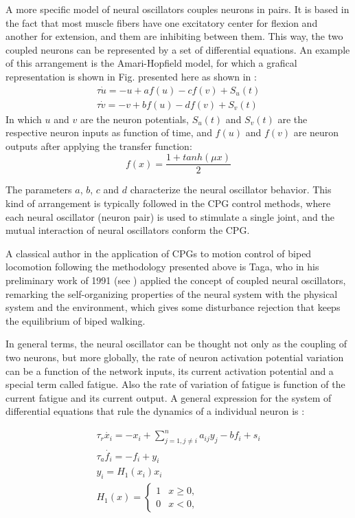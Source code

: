 A more specific model of neural oscillators couples neurons in
pairs. It is based in the fact that most muscle fibers have one
excitatory center for flexion and another for extension, and them are
inhibiting between them. This way, the two coupled neurons can be
represented by a set of differential equations. An example of this
arrangement is the Amari-Hopfield model, for which a grafical
representation is shown in Fig. presented here as shown in
\cite{Nakada2003}:
\begin{eqnarray}
  \tau\dot{u}=-u+af(u)-cf(v)+S_u(t) \\
  \tau\dot{v}=-v+bf(u)-df(v)+S_v(t)
\end{eqnarray}
In which $u$ and $v$ are the neuron potentials, $S_u(t)$ and $S_v(t)$
are the respective neuron inputs as function of time, and $f(u)$ and
$f(v)$ are neuron outputs after applying the transfer function:
\begin{equation}
  f(x)=\frac{1+tanh(\mu x)}{2}
\end{equation}


The parameters $a$, $b$, $c$ and $d$ characterize the neural
oscillator behavior. This kind of arrangement is typically followed in
the CPG control methods, where each neural oscillator (neuron pair) is
used to stimulate a single joint, and the mutual interaction of neural
oscillators conform the CPG.


A classical author in the application of CPGs to motion control of
biped locomotion following the methodology presented above is Taga,
who in his preliminary work of 1991 (see \cite{Taga1991}) applied the
concept of coupled neural oscillators, remarking the self-organizing
properties of the neural system with the physical system and the
environment, which gives some disturbance rejection that keeps the
equilibrium of biped walking.
 

In general terms, the neural oscillator can be thought not only as the
coupling of two neurons, but more globally, the rate of neuron
activation potential variation can be a function of the network
inputs, its current activation potential and a special term called
fatigue. Also the rate of variation of fatigue is function of the
current fatigue and its current output. A general expression for the
system of differential equations that rule the dynamics of a
individual neuron is \cite{Cao98design}:

\begin{eqnarray}
  \tau_r\dot{x_i}=-x_i+\displaystyle\sum_{j=1,j\neq i}^n a_{ij}y_j-bf_i+s_i \\
  \tau_a\dot{f_i}=-f_i+y_i \\
  y_i=H_1(x_i)x_i \\
  H_1(x)=\displaystyle\left\{ \begin{array}{cc}
      1 & x\geq 0, \\
      0 & x < 0, 
    \end{array} \right.
\end{eqnarray}



